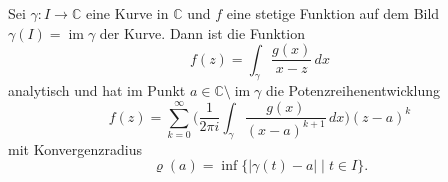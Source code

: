 \begin{satz}
Sei $\gamma\colon I\to\mathbb{C}$ eine Kurve in $\mathbb{C}$ und
$f$ eine stetige Funktion auf dem Bild $\gamma(I)=\operatorname{im}\gamma$
der Kurve.
Dann ist die Funktion 
\[
f(z)
=
\int_{\gamma} \frac{g(x)}{x-z}\,dx
\]
analytisch und hat im Punkt $a\in\mathbb{C}\setminus \operatorname{im}\gamma$
die Potenzreihenentwicklung
\[
f(z)
=
\sum_{k=0}^\infty
\biggl(
\frac1{2\pi i}
\int_\gamma \frac{g(x)}{(x-a)^{k+1}}\,dx
\biggr)
(z-a)^k
\]
mit Konvergenzradius
\[
\varrho(a)
=
\inf\{ |\gamma(t)-a|\mid t\in I\}.
\]
\end{satz}
